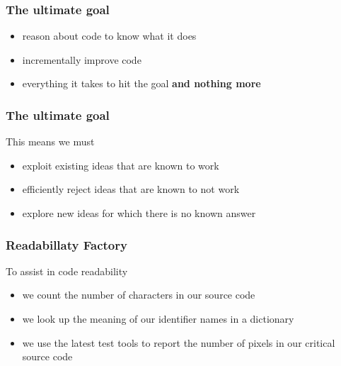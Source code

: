 
\begin{frame}
\frametitle{The ultimate goal}
\begin{itemize}
  \item reason about code to know what it does
  \item incrementally improve code
  \item everything it takes to hit the goal \textbf{and nothing more}
\end{itemize}
\end{frame}


\begin{frame}
\frametitle{The ultimate goal}
\begin{block}{This means we must}
\begin{itemize}
  \item exploit existing ideas that are known to work
  \item efficiently reject ideas that are known to not work
  \item explore new ideas for which there is no known answer
\end{itemize}
\end{block}
\end{frame}


\begin{frame}
\frametitle{Readabillaty Factory}
\begin{block}{To assist in code readability}
\begin{itemize}
  \item we count the number of characters in our source code
  \item we look up the meaning of our identifier names in a dictionary
  \item we use the latest test tools to report the number of pixels in our critical source code
\end{itemize}
\end{block}
\end{frame}

